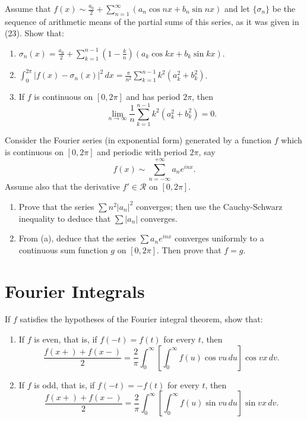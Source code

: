 \begin{problembox}
Assume that $f(x) \sim \frac{a_0}{2} + \sum_{n=1}^\infty (a_n \cos nx + b_n \sin nx)$ and let $\{\sigma_n\}$ be the sequence of arithmetic means of the partial sums of this series, as it was given in (23). Show that:
\begin{enumerate}[label=(\alph*)]
\item $\sigma_n(x) = \frac{a_0}{2} + \sum_{k=1}^{n-1} \left(1 - \frac{k}{n}\right) (a_k \cos kx + b_k \sin kx)$.
\item $\int_0^{2\pi} |f(x) - \sigma_n(x)|^2 \, dx = \frac{\pi}{n^2} \sum_{k=1}^{n-1} k^2 (a_k^2 + b_k^2)$.
\item If $f$ is continuous on $[0, 2\pi]$ and has period $2\pi$, then
\[
\lim_{n \to \infty} \frac{1}{n} \sum_{k=1}^{n-1} k^2 (a_k^2 + b_k^2) = 0.
\]
\end{enumerate}
\end{problembox}

\begin{problembox}
Consider the Fourier series (in exponential form) generated by a function $f$ which is continuous on $[0, 2\pi]$ and periodic with period $2\pi$, say
\[
f(x) \sim \sum_{n=-\infty}^{+\infty} a_n e^{inx}.
\]
Assume also that the derivative $f' \in \mathcal{R}$ on $[0, 2\pi]$. 
\begin{enumerate}[label=(\alph*)]
\item Prove that the series $\sum n^2 |a_n|^2$ converges; then use the Cauchy-Schwarz inequality to deduce that $\sum |a_n|$ converges.
\item From (a), deduce that the series $\sum a_n e^{inx}$ converges uniformly to a continuous sum function $g$ on $[0, 2\pi]$. Then prove that $f = g$.
\end{enumerate}
\end{problembox}

\section{Fourier Integrals}

\begin{problembox}
If $f$ satisfies the hypotheses of the Fourier integral theorem, show that:
\begin{enumerate}[label=(\alph*)]
\item If $f$ is even, that is, if $f(-t) = f(t)$ for every $t$, then
\[
\frac{f(x+) + f(x-)}{2} = \frac{2}{\pi} \int_0^\infty \left[ \int_0^\infty f(u) \cos vu \, du \right] \cos vx \, dv.
\]
\item If $f$ is odd, that is, if $f(-t) = -f(t)$ for every $t$, then
\[
\frac{f(x+) + f(x-)}{2} = \frac{2}{\pi} \int_0^\infty \left[ \int_0^\infty f(u) \sin vu \, du \right] \sin vx \, dv.
\]
\end{enumerate}
\end{problembox}

